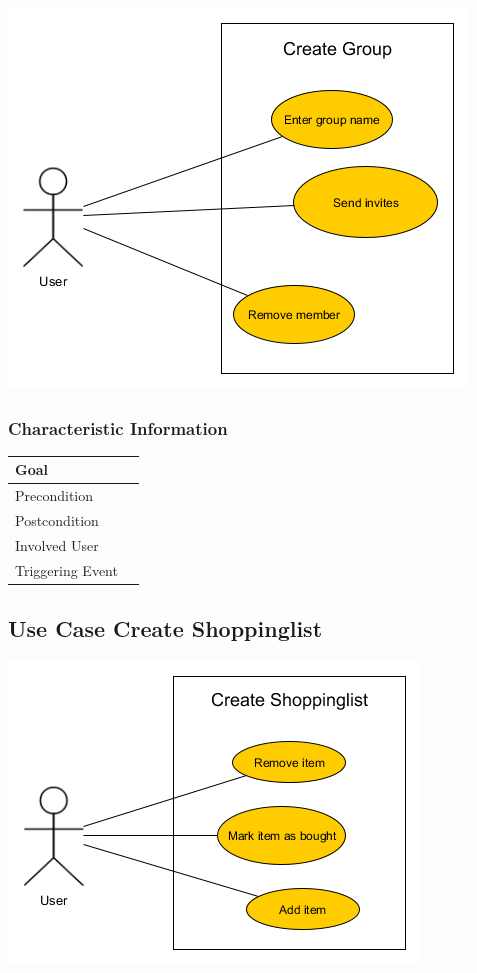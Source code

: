 \documentclass[12pt]{article}
\theoremstyle{definition}
\begin{document}
\includegraphics[scale=.5]{UseCaseCreateGroup.png}\\



\subsubsection{Characteristic Information}

\begin{tabular}{|l|l|}
\hline
Goal &  \\ \hline
Precondition &  \\ \hline
Postcondition &  \\ \hline
Involved User &  \\ \hline
Triggering Event &  \\ \hline
\end{tabular}

\subsection{Use Case Create Shoppinglist}

\includegraphics[scale=.5]{UseCaseCreateShoppinglist.png}\\
\end{document}
